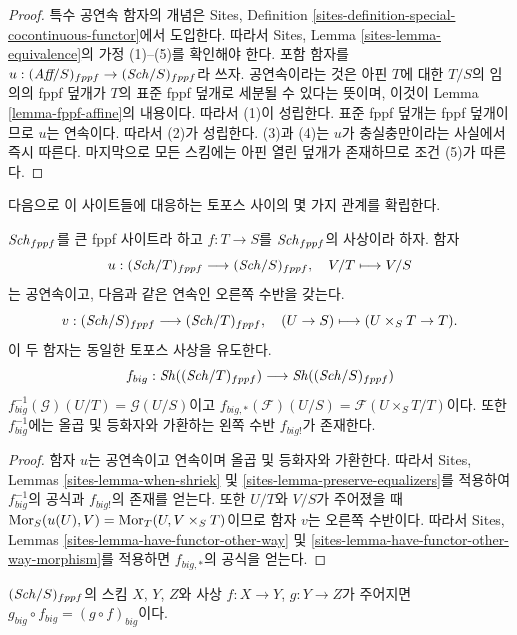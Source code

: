 \begin{proof}
특수 공연속 함자의 개념은 Sites, Definition
\ref{sites-definition-special-cocontinuous-functor}에서 도입한다. 따라서
Sites, Lemma \ref{sites-lemma-equivalence}의 가정 (1)--(5)를 확인해야
한다. 포함 함자를
$u : (\textit{Aff}/S)_{fppf} \to (\mathit{Sch}/S)_{fppf}$라 쓰자. 공연속이라는
것은 아핀 $T$에 대한 $T/S$의 임의의 fppf 덮개가 $T$의 표준 fppf
덮개로 세분될 수 있다는 뜻이며, 이것이 Lemma
\ref{lemma-fppf-affine}의 내용이다. 따라서 (1)이 성립한다. 표준 fppf
덮개는 fppf 덮개이므로 $u$는 연속이다. 따라서 (2)가 성립한다. (3)과
(4)는 $u$가 충실충만이라는 사실에서 즉시 따른다. 마지막으로 모든
스킴에는 아핀 열린 덮개가 존재하므로 조건 (5)가 따른다.
\end{proof}

\noindent
다음으로 이 사이트들에 대응하는 토포스 사이의 몇 가지 관계를
확립한다.

\begin{lemma}
\label{lemma-morphism-big-fppf}
$\mathit{Sch}_{fppf}$를 큰 fppf 사이트라 하고
$f : T \to S$를 $\mathit{Sch}_{fppf}$의 사상이라 하자. 함자
$$
u : (\mathit{Sch}/T)_{fppf} \longrightarrow (\mathit{Sch}/S)_{fppf},
\quad
V/T \longmapsto V/S
$$
는 공연속이고, 다음과 같은 연속인 오른쪽 수반을 갖는다.
$$
v : (\mathit{Sch}/S)_{fppf} \longrightarrow (\mathit{Sch}/T)_{fppf},
\quad
(U \to S) \longmapsto (U \times_S T \to T).
$$
이 두 함자는 동일한 토포스 사상을 유도한다.
$$
f_{big} :
\mathop{\mathit{Sh}}\nolimits((\mathit{Sch}/T)_{fppf})
\longrightarrow
\mathop{\mathit{Sh}}\nolimits((\mathit{Sch}/S)_{fppf})
$$
$f_{big}^{-1}(\mathcal{G})(U/T) = \mathcal{G}(U/S)$이고
$f_{big, *}(\mathcal{F})(U/S) = \mathcal{F}(U \times_S T/T)$이다.
또한 $f_{big}^{-1}$에는 올곱 및 등화자와 가환하는 왼쪽 수반
$f_{big!}$가 존재한다.
\end{lemma}

\begin{proof}
함자 $u$는 공연속이고 연속이며 올곱 및 등화자와 가환한다. 따라서
Sites, Lemmas \ref{sites-lemma-when-shriek} 및
\ref{sites-lemma-preserve-equalizers}를 적용하여 $f_{big}^{-1}$의 공식과
$f_{big!}$의 존재를 얻는다. 또한 $U/T$와 $V/S$가 주어졌을 때
$\mathop{\mathrm{Mor}}\nolimits_S(u(U), V) = \mathop{\mathrm{Mor}}\nolimits_T(U, V \times_S T)$이므로 함자 $v$는 오른쪽
수반이다. 따라서 Sites, Lemmas
\ref{sites-lemma-have-functor-other-way} 및
\ref{sites-lemma-have-functor-other-way-morphism}를 적용하면
$f_{big, *}$의 공식을 얻는다.
\end{proof}

\begin{lemma}
\label{lemma-composition-fppf}
$(\mathit{Sch}/S)_{fppf}$의 스킴 $X$, $Y$, $Z$와 사상
$f : X \to Y$, $g : Y \to Z$가 주어지면
$g_{big} \circ f_{big} = (g \circ f)_{big}$이다.
\end{lemma}

